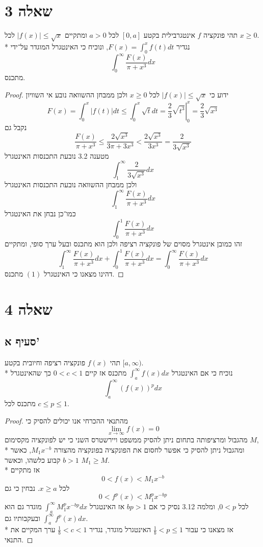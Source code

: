 \section{שאלה 3}
תהי פונקציה $f$ אינטגרבילית בקטע $[0, a]$ לכל $a > 0$ ומתקיים $\lvert f(x) \rvert \le \sqrt{x}$ לכל $x \ge 0$. \\*
נגדיר $F(x) = \int_0^x f(t) dt$, ונוכיח כי האינטגרל המוגדר על־ידי
\[
	\int_0^\infty \frac{F(x)}{\pi + x^3} dx \tag{1}
\]
מתכנס.
\begin{proof}
	ידוע כי $\lvert f(x) \rvert \le \sqrt{x}$ לכל $x \ge 0$ ולכן ממבחן ההשוואה נובע אי השוויון
	\[
		F(x) = \int_0^x \lvert f(t) \rvert dt \le \int_0^x \sqrt{t} dt = \left. \frac{2}{3} \sqrt{t^3} \right|_0^x = \frac{2}{3} \sqrt{x^3}
	\]
	נקבל גם
	\[
		\frac{F(x)}{\pi + x^3}
		\le \frac{2 \sqrt{x^3}}{3 \pi + 3 x^3}
		< \frac{2 \sqrt{x^3}}{3 x^3}
		= \frac{2}{3 \sqrt{x^3}}
		\tag{2}
	\]
	מטענה 3.2 נובעת התכנסות האינטגרל
	\[
		\int_{1}^{\infty} \frac{2}{3 \sqrt{x^3}} dx
	\]
	ולכן ממבחן ההשוואה נובעת התכנסות האינטגרל
	\[
		\int_1^\infty \frac{F(x)}{\pi + x^3} dx
	\]
	כמו־כן נבחן את האינטגרל
	\[
		\int_0^1 \frac{F(x)}{\pi + x^3} dx
	\]
	זהו כמובן אינטגרל מסוים של פונקציה רציפה ולכן הוא מתכנס ובעל ערך סופי, ומתקיים
	\[
		\int_1^\infty \frac{F(x)}{\pi + x^3} dx + \int_0^1 \frac{F(x)}{\pi + x^3} dx
		= \int_0^\infty \frac{F(x)}{\pi + x^3} dx
	\]
	דהינו מצאנו כי האינטגרל $(1)$ מתכנס.
\end{proof}

\section{שאלה 4}
\subsection{סעיף א'}
תהי $f(x)$ פונקציה רציפה וחיובית בקטע $[a, \infty)$. \\* %
נוכיח כי אם האינטגרל $\int_a^\infty f(x) dx$ מתכנס אז קיים $0 < c < 1$ כך שהאינטגרל
\[
	\int_a^\infty {(f(x))}^p dx
\]
מתכנס לכל $c \le p \le 1$.
\begin{proof}
	מהתנאי ההכרחי אנו יכולים להסיק כי
	\[
		\lim_{x \to \infty} f(x) = 0
	\]
	מהגבול ומרציפותה בתחום ניתן להסיק ממשפט ויירשטרס השני כי יש לפונקציה מקסימום $M$, \\*
	ומהגבול ניתן להסיק כי אפשר לחסום את הפונקציה בפונקציה מהצורה $M_1 x^{-b}$, כאשר $b > 1$ קבוע כלשהו, וכאשר $M_1 \ge M$. \\*
	אז מתקיים
	\[
		0 < f(x) < M_1 x^{-b}
	\]
	לכל $x \ge a$. נבחין כי גם
	\[
		0 < f^p(x) < M_1^p x^{-bp}
	\]
	לכל $0 < p$, ומלמה 3.12 נסיק כי אם $bp > 1$ אז האינטגרל $\int_a^\infty M_1^p x^{-bp}dx$ מוגדר גם הוא ובעקבותיו גם $\int_a^\infty f^p(x) dx$. \\*
	אז מצאנו כי עבור $\frac{1}{b} < p \le 1$ האינטגרל מוגדר,
	נגדיר $\frac{1}{b} < c < 1$ ערך המקיים את התנאי.
\end{proof}

